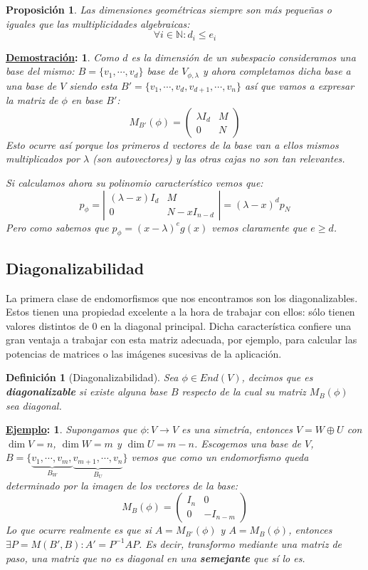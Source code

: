 \documentclass[10pt,a4paper,openright]{book}
\theoremstyle{break}
\newtheorem*{defi}{Definición}
\newtheorem*{prop}{Proposición}
\newtheorem*{demo}{\underline{Demostración}:}
\newtheorem*{ej}{\underline{Ejemplo}:}
\begin{document}
\begin{prop}
Las dimensiones geométricas siempre son más pequeñas o iguales que las multiplicidades algebraicas:
$$\forall i \in \mathbb N: d_i\leq e_i$$
\end{prop}
\begin{demo}
Como $d$ es la dimensión de un subespacio consideramos una base del mismo: $B=\{v_1, \cdots, v_d\}$ base de $V_{\phi, \lambda}$ y ahora completamos dicha base a una base de $V$ siendo esta $B'=\{v_1,\cdots,v_d, v_{d+1},\cdots, v_n\}$ así que vamos a expresar la matriz de $\phi$ en base $B'$:
$$M_{B'}(\phi)=\left(\begin{array}{c|c}\lambda I_d & M \\ \hline 0 & N \end{array}\right)$$
Esto ocurre así porque los primeros $d$ vectores de la base van a ellos mismos multiplicados por $\lambda$ (son autovectores) y las otras cajas no son tan relevantes.

Si calculamos ahora su polinomio característico vemos que:
$$p_\phi=\left|\begin{array}{c|c}(\lambda-x) I_d & M\\ \hline 0 & N-xI_{n-d} \end{array}\right|=(\lambda-x)^d p_N$$
Pero como sabemos que $p_\phi=(x-\lambda)^e g(x)$ vemos claramente que $e\geq d$.
\end{demo}

\subsection{Diagonalizabilidad}
La primera clase de endomorfismos que nos encontramos son los diagonalizables. Estos tienen una propiedad excelente a la hora de trabajar con ellos: sólo tienen valores distintos de $0$ en la diagonal principal. Dicha característica confiere una gran ventaja a trabajar con esta matriz adecuada, por ejemplo, para calcular las potencias de matrices o las imágenes sucesivas de la aplicación.

\begin{defi}[Diagonalizabilidad]
Sea $\phi\in End(V)$, decimos que es \textbf{diagonalizable} si existe alguna base $B$ respecto de la cual su matriz $M_B(\phi)$ sea diagonal.
\end{defi}

\begin{ej}
Supongamos que $\phi: V\rightarrow V$ es una simetría, entonces $V=W\oplus U$ con $\dim V=n$, $\dim W=m$ y $\dim U = m-n$. Escogemos una base de $V$, $B=\{\underbrace{v_1, \cdots, v_m,}_{B_W} \underbrace{v_{m+1}, \cdots, v_n}_{B_U}\}$ vemos que como un endomorfismo queda determinado por la imagen de los vectores de la base:
$$M_B(\phi)=\left(\begin{array}{c|c} I_n & 0 \\ \hline 0 & -I_{n-m} \end{array}\right)$$
Lo que ocurre realmente es que si $A=M_{B'}(\phi)$ y $A=M_B(\phi)$, entonces $\exists P=M(B',B): A'=P^{-1}AP$. Es decir, transformo mediante una matriz de paso, una matriz que no es diagonal en una \textbf{semejante} que sí lo es.
\end{ej}
\end{document}
